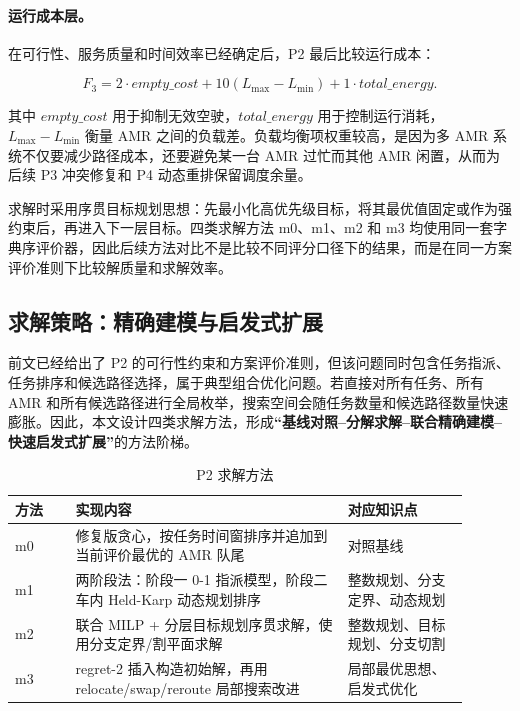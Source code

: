\paragraph{运行成本层。}
在可行性、服务质量和时间效率已经确定后，P2 最后比较运行成本：

\[
F_3=2\cdot empty\_cost+10(L_{\max}-L_{\min})+1\cdot total\_energy.
\]

其中 $empty\_cost$ 用于抑制无效空驶，$total\_energy$ 用于控制运行消耗，$L_{\max}-L_{\min}$ 衡量 AMR 之间的负载差。负载均衡项权重较高，是因为多 AMR 系统不仅要减少路径成本，还要避免某一台 AMR 过忙而其他 AMR 闲置，从而为后续 P3 冲突修复和 P4 动态重排保留调度余量。

求解时采用序贯目标规划思想：先最小化高优先级目标，将其最优值固定或作为强约束后，再进入下一层目标。四类求解方法 m0、m1、m2 和 m3 均使用同一套字典序评价器，因此后续方法对比不是比较不同评分口径下的结果，而是在同一方案评价准则下比较解质量和求解效率。

\subsection{求解策略：精确建模与启发式扩展}

前文已经给出了 P2 的可行性约束和方案评价准则，但该问题同时包含任务指派、任务排序和候选路径选择，属于典型组合优化问题。若直接对所有任务、所有 AMR 和所有候选路径进行全局枚举，搜索空间会随任务数量和候选路径数量快速膨胀。因此，本文设计四类求解方法，形成\textbf{“基线对照--分解求解--联合精确建模--快速启发式扩展”}的方法阶梯。

\begin{table}[!htbp]
\centering
\small
\begin{tabular}{>{\raggedright\arraybackslash}p{0.12\linewidth}>{\raggedright\arraybackslash}p{0.54\linewidth}>{\raggedright\arraybackslash}p{0.24\linewidth}}
\toprule
方法 & 实现内容 & 对应知识点 \\
\midrule
m0 & 修复版贪心，按任务时间窗排序并追加到当前评价最优的 AMR 队尾 & 对照基线 \\
m1 & 两阶段法：阶段一 0-1 指派模型，阶段二车内 Held-Karp 动态规划排序 & 整数规划、分支定界、动态规划 \\
m2 & 联合 MILP + 分层目标规划序贯求解，使用分支定界/割平面求解 & 整数规划、目标规划、分支切割 \\
m3 & regret-2 插入构造初始解，再用 relocate/swap/reroute 局部搜索改进 & 局部最优思想、启发式优化 \\
\bottomrule
\end{tabular}
\caption{P2 求解方法}
\end{table}

